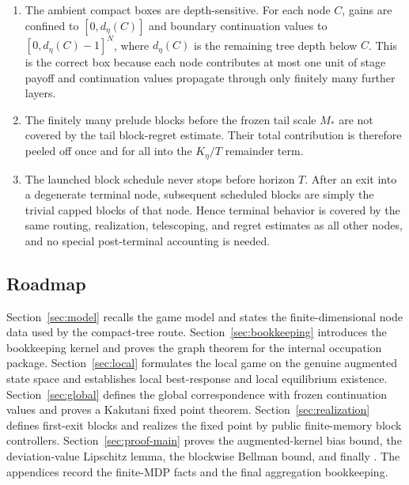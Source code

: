 \documentclass[12pt]{article}
\theoremstyle{definition}
\newcommand{\1}{\mathbf{1}}
\begin{document}
\begin{enumerate}[label=\textnormal{(\arabic*)},leftmargin=2.4em]
regret comparison, however, one does not repartition play according to the
random live times. One keeps the launched block partition fixed and compares the
compliant and deviating payoffs on those same scheduled block intervals.
\item The ambient compact boxes are depth-sensitive. For each node $C$, gains are
confined to $[0,d_\eta(C)]$ and boundary continuation values to
$[0,d_\eta(C)-1]^N$, where $d_\eta(C)$ is the remaining tree depth below $C$.
This is the correct box because each node contributes at most one unit of stage
payoff and continuation values propagate through only finitely many further
layers.
\item The finitely many prelude blocks before the frozen tail scale $M_*$ are not
covered by the tail block-regret estimate. Their total contribution is therefore
peeled off once and for all into the $K_\eta/T$ remainder term.
\item The launched block schedule never stops before horizon $T$. After an exit
into a degenerate terminal node, subsequent scheduled blocks are simply the
trivial capped blocks of that node. Hence terminal behavior is covered by the
same routing, realization, telescoping, and regret estimates as all other
nodes, and no special post-terminal accounting is needed.
\end{enumerate}

\subsection{Roadmap}


Section~\ref{sec:model} recalls the game model and states the finite-dimensional
node data used by the compact-tree route. Section~\ref{sec:bookkeeping}
introduces the bookkeeping kernel and proves the graph theorem for the internal
occupation package. Section~\ref{sec:local} formulates the local game on the
genuine augmented state space and establishes local best-response and local
equilibrium existence. Section~\ref{sec:global} defines the global correspondence
with frozen continuation values and proves a Kakutani fixed point theorem.
Section~\ref{sec:realization} defines first-exit blocks and realizes the fixed
point by public finite-memory block controllers. Section~\ref{sec:proof-main}
proves the augmented-kernel bias bound, the deviation-value Lipschitz lemma, the
blockwise Bellman bound, and finally . The appendices record the
finite-MDP facts and the final aggregation bookkeeping.
\end{document}
